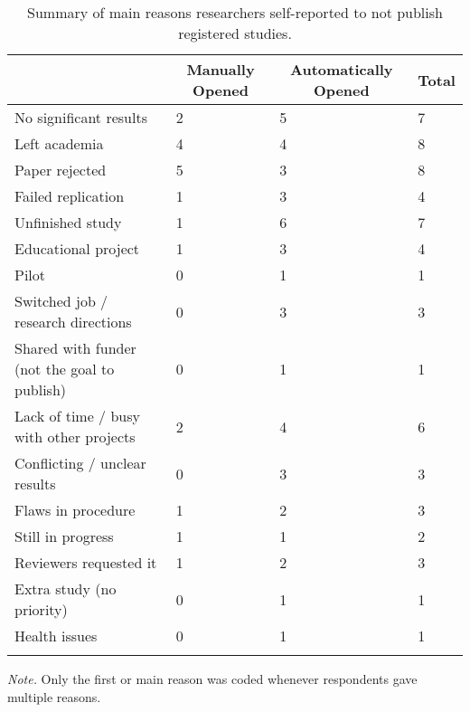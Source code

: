 \documentclass[
  ,jou, a4paper,floatsintext]{apa6}
\begin{document}
\begin{table*}[tbp]

\begin{center}
\begin{threeparttable}

\caption{\label{tab:reasons-non-publish}Summary of main reasons researchers self-reported to not publish registered studies.}

\begin{tabular}{llll}
\toprule
 & \multicolumn{1}{c}{Manually Opened} & \multicolumn{1}{c}{Automatically Opened} & \multicolumn{1}{c}{Total}\\
\midrule
No significant results & 2 & 5 & 7\\
Left academia & 4 & 4 & 8\\
Paper rejected & 5 & 3 & 8\\
Failed replication & 1 & 3 & 4\\
Unfinished study & 1 & 6 & 7\\
Educational project & 1 & 3 & 4\\
Pilot & 0 & 1 & 1\\
Switched job / research directions & 0 & 3 & 3\\
Shared with funder (not the goal to publish) & 0 & 1 & 1\\
Lack of time / busy with other projects & 2 & 4 & 6\\
Conflicting / unclear results & 0 & 3 & 3\\
Flaws in procedure & 1 & 2 & 3\\
Still in progress & 1 & 1 & 2\\
Reviewers requested it & 1 & 2 & 3\\
Extra study (no priority) & 0 & 1 & 1\\
Health issues & 0 & 1 & 1\\
\bottomrule
\addlinespace
\end{tabular}

\begin{tablenotes}[para]
\normalsize{\textit{Note.} Only the first or main reason was coded whenever respondents gave multiple reasons.}
\end{tablenotes}

\end{threeparttable}
\end{center}

\end{table*}
\end{document}

